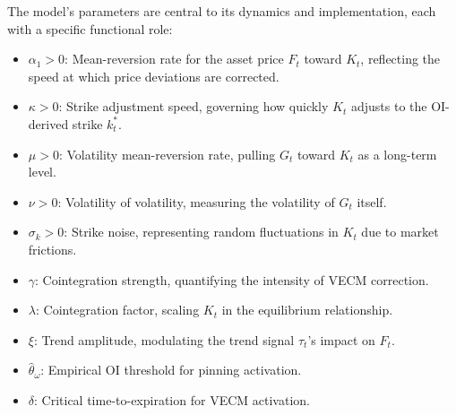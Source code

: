 \documentclass[12pt]{report}
\begin{document}
The model’s parameters are central to its dynamics and implementation, each with a specific functional role:
\begin{itemize}\setlength{\itemsep}{0pt}\setlength{\parskip}{4pt}
    \item \(\alpha_1 > 0\): Mean-reversion rate for the asset price \(F_t\) toward \(K_t\), reflecting the speed at which price deviations are corrected.
    \item \(\kappa > 0\): Strike adjustment speed, governing how quickly \(K_t\) adjusts to the OI-derived strike \(k_t^*\).
    \item \(\mu > 0\): Volatility mean-reversion rate, pulling \(G_t\) toward \(K_t\) as a long-term level.
    \item \(\nu > 0\): Volatility of volatility, measuring the volatility of \(G_t\) itself.
    \item \(\sigma_k > 0\): Strike noise, representing random fluctuations in \(K_t\) due to market frictions.
    \item \(\gamma\): Cointegration strength, quantifying the intensity of VECM correction.
    \item \(\lambda\): Cointegration factor, scaling \(K_t\) in the equilibrium relationship.
    \item \(\xi\): Trend amplitude, modulating the trend signal \(\tau_t\)’s impact on \(F_t\).
    \item \(\hat{\theta}_\omega\): Empirical OI threshold for pinning activation.
    \item \(\delta\): Critical time-to-expiration for VECM activation.
\end{itemize}
\end{document}
